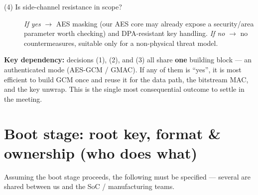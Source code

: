 \documentclass[11pt,a4paper]{article}
\begin{document}
\begin{description}
  \item[(4) Is side-channel resistance in scope?]
    \emph{If yes} $\rightarrow$ AES masking (our AES core may already expose a security/area
    parameter worth checking) and DPA-resistant key handling.
    \emph{If no} $\rightarrow$ no countermeasures, suitable only for a non-physical threat model.

\end{description}

\noindent\textbf{Key dependency:} decisions (1), (2), and (3) all share \textbf{one} building block ---
an authenticated mode (AES-GCM / GMAC). If any of them is ``yes'', it is most efficient to build GCM
once and reuse it for the data path, the bitstream MAC, and the key unwrap. This is the single most
consequential outcome to settle in the meeting.

\section{Boot stage: root key, format \& ownership (who does what)}

\noindent Assuming the boot stage proceeds, the following must be specified --- several are
shared between us and the SoC / manufacturing teams.
\end{document}
